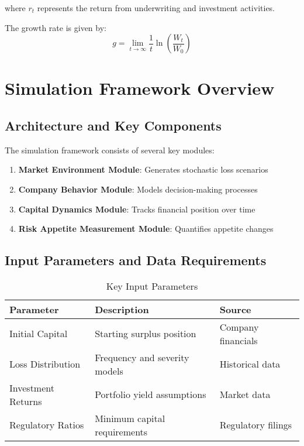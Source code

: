 \documentclass[11pt,letterpaper]{article}
\begin{document}
where $r_t$ represents the return from underwriting and investment activities.

The growth rate is given by:
\begin{equation}
g = \lim_{t \to \infty} \frac{1}{t} \ln\left(\frac{W_t}{W_0}\right)
\end{equation}


\section{Simulation Framework Overview}

\subsection{Architecture and Key Components}

The simulation framework consists of several key modules:

\begin{enumerate}
    \item \textbf{Market Environment Module}: Generates stochastic loss scenarios
    \item \textbf{Company Behavior Module}: Models decision-making processes
    \item \textbf{Capital Dynamics Module}: Tracks financial position over time
    \item \textbf{Risk Appetite Measurement Module}: Quantifies appetite changes
\end{enumerate}

\subsection{Input Parameters and Data Requirements}

\begin{table}[H]
\centering
\caption{Key Input Parameters}
\begin{tabular}{@{}lll@{}}
\toprule
Parameter & Description & Source \\
\midrule
Initial Capital & Starting surplus position & Company financials \\
Loss Distribution & Frequency and severity models & Historical data \\
Investment Returns & Portfolio yield assumptions & Market data \\
Regulatory Ratios & Minimum capital requirements & Regulatory filings \\
\bottomrule
\end{tabular}
\end{table}
\end{document}
